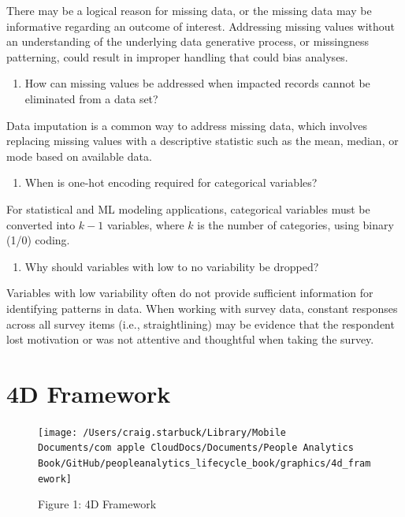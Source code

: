 \documentclass[]{book}
\providecommand{\tightlist}{%
  \setlength{\itemsep}{0pt}\setlength{\parskip}{0pt}}
\begin{document}
There may be a logical reason for missing data, or the missing data may be informative regarding an outcome of interest. Addressing missing values without an understanding of the underlying data generative process, or missingness patterning, could result in improper handling that could bias analyses.

\begin{enumerate}
\def\labelenumi{\arabic{enumi}.}
\setcounter{enumi}{7}
\tightlist
\item
  How can missing values be addressed when impacted records cannot be eliminated from a data set?
\end{enumerate}

Data imputation is a common way to address missing data, which involves replacing missing values with a descriptive statistic such as the mean, median, or mode based on available data.

\begin{enumerate}
\def\labelenumi{\arabic{enumi}.}
\setcounter{enumi}{8}
\tightlist
\item
  When is one-hot encoding required for categorical variables?
\end{enumerate}

For statistical and ML modeling applications, categorical variables must be converted into \(k-1\) variables, where \(k\) is the number of categories, using binary (1/0) coding.

\begin{enumerate}
\def\labelenumi{\arabic{enumi}.}
\setcounter{enumi}{9}
\tightlist
\item
  Why should variables with low to no variability be dropped?
\end{enumerate}

Variables with low variability often do not provide sufficient information for identifying patterns in data. When working with survey data, constant responses across all survey items (i.e., straightlining) may be evidence that the respondent lost motivation or was not attentive and thoughtful when taking the survey.

\hypertarget{d-framework-1}{%
\section{4D Framework}\label{d-framework-1}}

\begin{figure}
\texttt{[image: /Users/craig.starbuck/Library/Mobile Documents/com~apple~CloudDocs/Documents/People Analytics Book/GitHub/peopleanalytics\_lifecycle\_book/graphics/4d\_framework]} \caption{Figure 1: 4D Framework}\label{fig:4d-overview}
\end{figure}
\end{document}
